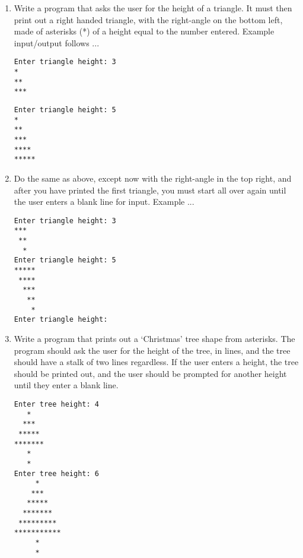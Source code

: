 \begin{enumerate}
	\item Write a program that asks the user for the height of a triangle.    It must then print out a right handed triangle, with the right-angle on the    bottom left, made of asterisks (*) of a height equal to the    number entered. Example input/output follows ...      
\begin{lstlisting}
Enter triangle height: 3
*
**
***
\end{lstlisting}
\begin{lstlisting}
Enter triangle height: 5
*
**
***
****
*****
\end{lstlisting}
	\item Do the same as above, except now with the right-angle in the top right, and after you have printed the first triangle, you must start all over again until the user enters a blank line for input. Example ...      
\begin{lstlisting}
Enter triangle height: 3
***
 **
  *
Enter triangle height: 5
*****
 ****
  ***
   **
    *
Enter triangle height: 
\end{lstlisting}
	\item Write a program that prints out a `Christmas' tree shape from    asterisks. The program should ask the user for the height of the    tree, in lines, and the tree should have a stalk of two lines    regardless. If the user enters a height, the tree should be printed    out, and the user should be prompted for another height until they    enter a blank line.     
\begin{lstlisting}
Enter tree height: 4
   *
  ***
 *****
*******
   *
   *
Enter tree height: 6
     *
    ***
   *****
  *******
 *********
***********
     *
     *
\end{lstlisting}
\end{enumerate}    
